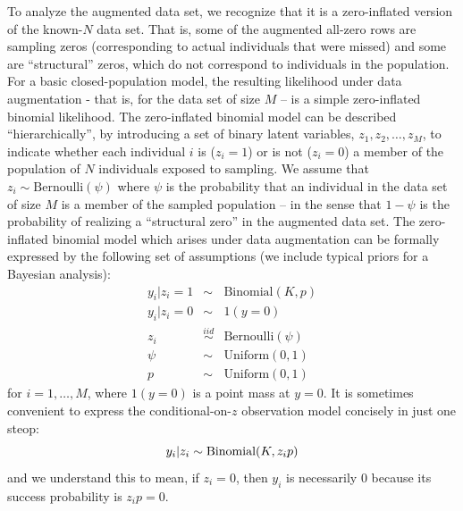 To analyze the augmented data set, we recognize that it is a
zero-inflated version of the known-$N$ data set. That is, some of the
augmented all-zero rows are sampling zeros (corresponding to actual
individuals that were missed) and some are ``structural'' zeros, which
do not correspond to individuals in the population. For a basic
closed-population model, the resulting likelihood under data
augmentation - that is, for the data set of size $M$ -- is a simple
zero-inflated binomial likelihood.  The zero-inflated binomial model
can be described ``hierarchically'', by introducing a set of binary
latent variables, $z_{1},z_{2},\ldots, z_{M}$, to indicate whether
each individual $i$ is ($z_i=1$) or is not ($z_i=0$) a member of the
population of $N$ individuals exposed to sampling. We assume that
$z_{i} \sim \mbox{Bernoulli}(\psi)$ where $\psi$ is the probability that an
individual in the data set of size $M$ is a member of the sampled
population -- in the sense that $1-\psi$ is the probability of
realizing a ``structural zero'' in the augmented data set.  The
zero-inflated binomial model which arises under data augmentation can
be formally expressed by the following set of assumptions (we include
typical priors for a Bayesian analysis):
\begin{eqnarray*}
 y_{i}|{z_{i}=1} & \sim  &\mbox{Binomial}(K, p) \\
 y_{i}|{z_{i}=0} & \sim &  1(y=0)  \\
 z_{i} & \stackrel{iid}{\sim} & \mbox{Bernoulli}(\psi) \\
 \psi & \sim & \mathrm{Uniform}(0,1) \\
 p & \sim & \mathrm{Uniform}(0,1)
\end{eqnarray*}
for $i=1, \ldots, M$, where $1(y=0)$ is a point mass at
$y=0$.
It is sometimes convenient to express the conditional-on-$z$
observation model concisely in
just one steop:
\[
 y_{i}|z_{i}  \sim  \mbox{Binomial}(K, z_{i} p) \\
\]
and we understand this to mean, if $z_{i}=0$, then $y_{i}$ is
necessarily 0 because its success probability is $z_{i} p = 0$.

